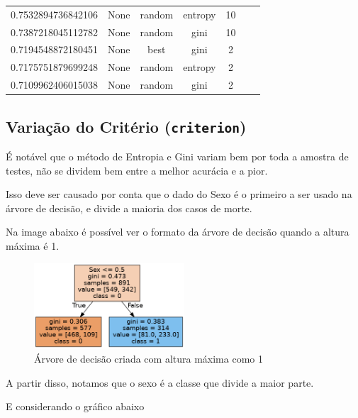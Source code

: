 \documentclass[a4paper,11pt]{article}
\begin{document}
\begin{table}[htbp]
\begin{tabular}{ccccccc}
        0.7532894736842106 & None       & random   & entropy   & 10                 \\
        0.7387218045112782 & None       & random   & gini      & 10                 \\
        0.7194548872180451 & None       & best     & gini      & 2                  \\
        0.7175751879699248 & None       & random   & entropy   & 2                  \\
        0.7109962406015038 & None       & random   & gini      & 2                  \\
        \bottomrule
    \end{tabular}
\end{table}

\subsection{Variação do Critério (\texttt{criterion})}

É notável que o método de Entropia e Gini variam bem por toda a amostra de testes, não se dividem bem entre a melhor acurácia e a pior.

Isso deve ser causado por conta que o dado do Sexo é o primeiro a ser usado na árvore de decisão, e divide a maioria dos casos de morte.

Na image abaixo é possível ver o formato da árvore de decisão quando a altura máxima é 1.

\begin{figure}[h]
    \centering
    \includegraphics[width=0.5\textwidth]{sex.png}
    \caption{Árvore de decisão criada com altura máxima como 1}
    \label{fig:nome_para_referenciar}
\end{figure}

A partir disso, notamos que o sexo é a classe que divide a maior parte.

E considerando o gráfico abaixo
\end{document}
